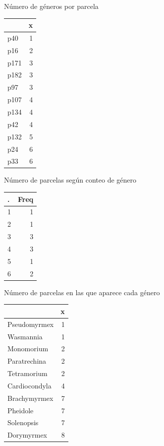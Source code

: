 \documentclass[11pt,]{article}
\newenvironment{Shaded}{\begin{snugshade}}{\end{snugshade}}
\newcommand{\StringTok}[1]{\textcolor[rgb]{0.31,0.60,0.02}{#1}}
\newcommand{\OperatorTok}[1]{\textcolor[rgb]{0.81,0.36,0.00}{\textbf{#1}}}
\newcommand{\NormalTok}[1]{#1}
\begin{document}
Número de géneros por parcela

\begin{Shaded}
\end{Shaded}

\begin{longtable}[]{@{}lr@{}}
\toprule
& x\tabularnewline
\midrule
\endhead
p40 & 1\tabularnewline
p16 & 2\tabularnewline
p171 & 3\tabularnewline
p182 & 3\tabularnewline
p97 & 3\tabularnewline
p107 & 4\tabularnewline
p134 & 4\tabularnewline
p42 & 4\tabularnewline
p132 & 5\tabularnewline
p24 & 6\tabularnewline
p33 & 6\tabularnewline
\bottomrule
\end{longtable}

Número de parcelas según conteo de género

\begin{Shaded}
\end{Shaded}

\begin{longtable}[]{@{}lr@{}}
\toprule
. & Freq\tabularnewline
\midrule
\endhead
1 & 1\tabularnewline
2 & 1\tabularnewline
3 & 3\tabularnewline
4 & 3\tabularnewline
5 & 1\tabularnewline
6 & 2\tabularnewline
\bottomrule
\end{longtable}

Número de parcelas en las que aparece cada género

\begin{Shaded}
\end{Shaded}

\begin{longtable}[]{@{}lr@{}}
\toprule
& x\tabularnewline
\midrule
\endhead
Pseudomyrmex & 1\tabularnewline
Wasmannia & 1\tabularnewline
Monomorium & 2\tabularnewline
Paratrechina & 2\tabularnewline
Tetramorium & 2\tabularnewline
Cardiocondyla & 4\tabularnewline
Brachymyrmex & 7\tabularnewline
Pheidole & 7\tabularnewline
Solenopsis & 7\tabularnewline
Dorymyrmex & 8\tabularnewline
\bottomrule
\end{longtable}
\end{document}
